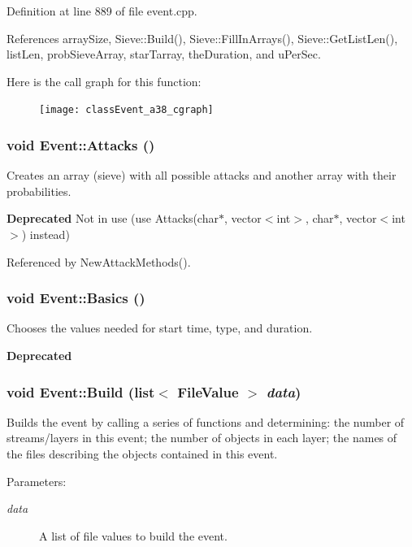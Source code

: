 Definition at line 889 of file event.cpp.

References array\-Size, Sieve::Build(), Sieve::Fill\-In\-Arrays(), Sieve::Get\-List\-Len(), list\-Len, prob\-Sieve\-Array, star\-Tarray, the\-Duration, and u\-Per\-Sec.

Here is the call graph for this function:\begin{figure}[H]
\begin{center}
\leavevmode
\texttt{[image: classEvent\_a38\_cgraph]}
\end{center}
\end{figure}
\subsubsection{\setlength{\rightskip}{0pt plus 5cm}void Event::Attacks ()}\label{classEvent_a37}


Creates an array (sieve) with all possible attacks and another array with their probabilities. 

\begin{Desc}
\item[{\bf Deprecated}]Not in use (use Attacks(char$\ast$, vector$<$int$>$, char$\ast$, vector$<$int$>$) instead) \end{Desc}


Referenced by New\-Attack\-Methods().
\subsubsection{\setlength{\rightskip}{0pt plus 5cm}void Event::Basics ()}\label{classEvent_a19}


Chooses the values needed for start time, type, and duration. 

\begin{Desc}
\item[{\bf Deprecated}]\end{Desc}
\subsubsection{\setlength{\rightskip}{0pt plus 5cm}void Event::Build (list$<$ {\bf File\-Value} $>$ {\em data})}\label{classEvent_a21}


Builds the event by calling a series of functions and determining: the number of streams/layers in this event; the number of objects in each layer; the names of the files describing the objects contained in this event. \begin{Desc}
\item[Parameters:]
\begin{description}
\item[{\em data}]A list of file values to build the event. \end{description}
\end{Desc}


